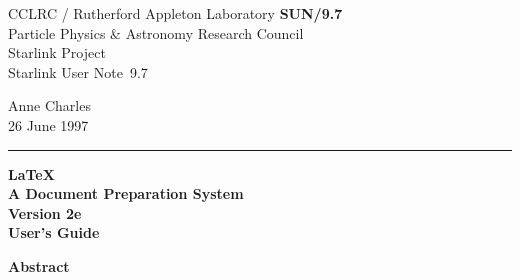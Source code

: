 \documentclass[11pt,twoside]{article}
\newcommand{\stardoccategory}  {Starlink User Note}
\newcommand{\stardocinitials}  {SUN}
\newcommand{\stardocnumber}    {9.7}
\newcommand{\stardocauthors}   {Anne Charles}
\newcommand{\stardocdate}      {26 June 1997}
\newcommand{\stardoctitle}     {\LaTeX \\ A Document Preparation System}
\newcommand{\stardocversion}   {Version 2e}
\newcommand{\stardocmanual}    {User's Guide}
\newcommand{\stardocname}{\stardocinitials /\stardocnumber}
\newenvironment{latexonly}{}{}
\begin{document}
\thispagestyle{empty}

\begin{latexonly}
   CCLRC / {\sc Rutherford Appleton Laboratory} \hfill {\bf \stardocname}\\
   {\large Particle Physics \& Astronomy Research Council}\\
   {\large Starlink Project\\}
   {\large \stardoccategory\ \stardocnumber}
   \begin{flushright}
   \stardocauthors\\
   \stardocdate
   \end{flushright}
   \vspace{-4mm}
   \rule{\textwidth}{0.5mm}
   \vspace{5mm}
   \begin{center}
   {\Huge\bf  \stardoctitle \\ [2.5ex]}
   {\LARGE\bf \stardocversion \\ [4ex]}
   {\Huge\bf  \stardocmanual}
   \end{center}
   \vspace{5mm}

   \vspace{10mm}
   \begin{center}
      {\Large\bf Abstract}
   \end{center}
\end{latexonly}
\end{document}

